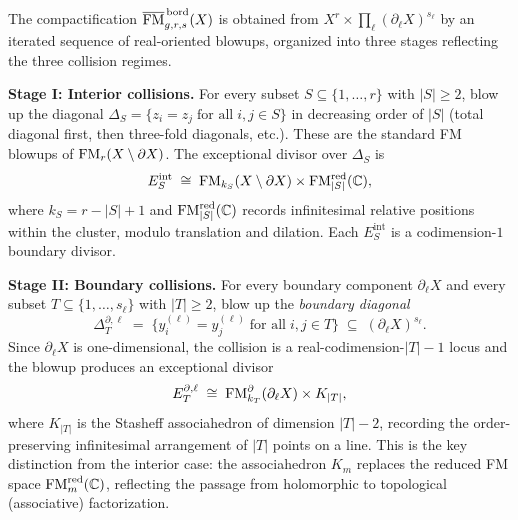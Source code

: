 \begin{construction}
\label{constr:bordered-FM}
The compactification
$\overline{\mathrm{FM}}^{\,\mathrm{bord}}_{g,r,s}(X)$ is obtained from
$X^r\times\prod_\ell(\partial_\ell X)^{s_\ell}$ by an iterated
sequence of real-oriented blowups, organized into three stages
reflecting the three collision regimes.

\medskip
\noindent\textbf{Stage I: Interior collisions.}
For every subset $S\subseteq\{1,\dotsc,r\}$ with $|S|\ge 2$,
blow up the diagonal
$\Delta_S=\{z_i=z_j\;\text{for all}\;i,j\in S\}$
in decreasing order of $|S|$ (total diagonal first, then
three-fold diagonals, etc.). These are the standard FM blowups
of $\mathrm{FM}_r(X\setminus\partial X)$. The exceptional divisor over
$\Delta_S$ is
\[
E_S^{\mathrm{int}}
\;\cong\;
\mathrm{FM}_{k_S}(X\setminus\partial X)\times\mathrm{FM}_{|S|}^{\mathrm{red}}(\mathbb C),
\]
where $k_S=r-|S|+1$ and $\mathrm{FM}_{|S|}^{\mathrm{red}}(\mathbb C)$ records
infinitesimal relative positions within the cluster, modulo
translation and dilation. Each $E_S^{\mathrm{int}}$ is a
codimension-$1$ boundary divisor.

\medskip
\noindent\textbf{Stage II: Boundary collisions.}
For every boundary component $\partial_\ell X$ and every subset
$T\subseteq\{1,\dotsc,s_\ell\}$ with $|T|\ge 2$, blow up the
\emph{boundary diagonal}
\[
\Delta_T^{\partial,\ell}
\;=\;
\bigl\{y_i^{(\ell)}=y_j^{(\ell)}\;\text{for all}\;i,j\in T\bigr\}
\;\subseteq\;
(\partial_\ell X)^{s_\ell}.
\]
Since $\partial_\ell X$ is one-dimensional, the collision is a
real-codimension-$|T|-1$ locus and the blowup produces an
exceptional divisor
\[
E_T^{\partial,\ell}
\;\cong\;
\mathrm{FM}_{k_T}^{\partial}(\partial_\ell X)\times K_{|T|},
\]
where $K_{|T|}$ is the Stasheff associahedron of dimension $|T|-2$,
recording the order-preserving infinitesimal arrangement of $|T|$
points on a line. This is the key distinction from the interior
case: the associahedron $K_m$ replaces the reduced FM space
$\mathrm{FM}_m^{\mathrm{red}}(\mathbb C)$, reflecting the passage from
holomorphic to topological (associative) factorization.


\end{construction}
